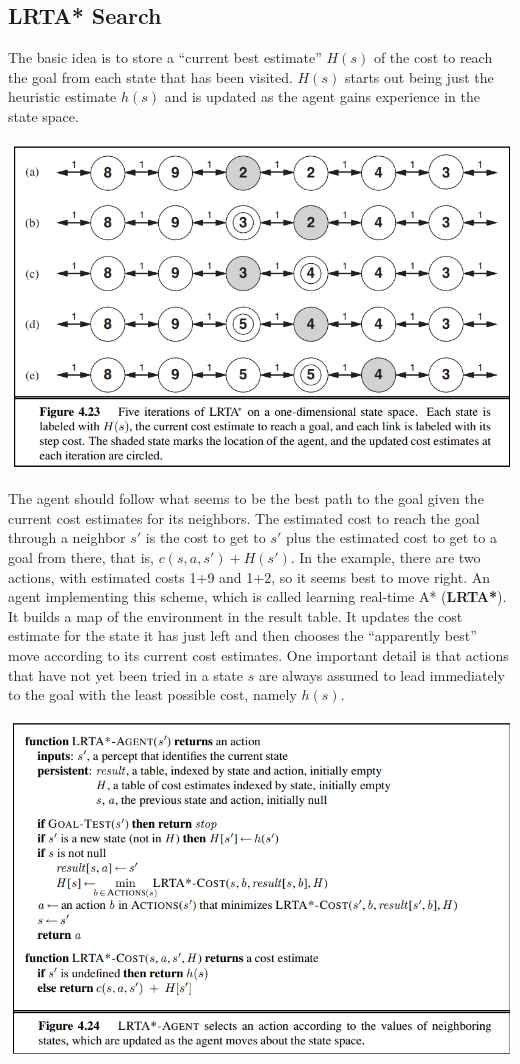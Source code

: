 \subsection{LRTA* Search}
The basic idea is to store a “current best estimate” $H(s)$ of the cost to reach the goal from each state that has been visited. $H(s)$ starts out being just the heuristic estimate $h(s)$ and is updated as the agent gains experience in the state space.
\begin{center}
    \includegraphics[scale=0.8]{images/LRTA.png}
\end{center}
The agent should follow what seems to be the best path to the goal given the current cost estimates for its neighbors.  The estimated cost to reach the goal through a neighbor $s'$ is the cost to get to $s'$ plus the estimated cost to get to a goal from there, that is, $c(s, a, s') + H(s')$. In the
example, there are two actions, with estimated costs 1+9 and 1+2, so it seems best to move right.\newline\newline
An agent implementing this scheme, which is called learning real-time A* (\textbf{LRTA*}). It builds a map of the environment in the result table. It updates the cost estimate for the state it has just left and then chooses the “apparently best” move according to its current cost estimates. One important detail is that actions that have not yet been tried in a state $s$ are always assumed to lead immediately to the goal with the least possible cost, namely $h(s)$.
\begin{center}
    \includegraphics[scale=0.8]{images/LRTA-2.png}
\end{center}
